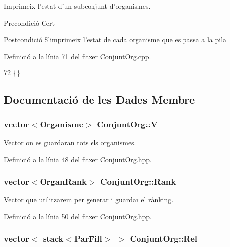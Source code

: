 Imprimeix l'estat d'un subconjunt d'organismes. 

\begin{DoxyPrecond}{Precondició}
Cert 
\end{DoxyPrecond}
\begin{DoxyPostcond}{Postcondició}
S'imprimeix l'estat de cada organisme que es passa a la pila 
\end{DoxyPostcond}


Definició a la línia 71 del fitxer Conjunt\-Org.\-cpp.


\begin{DoxyCode}
72 \{\}
\end{DoxyCode}


\subsection{Documentació de les Dades Membre}
\hypertarget{class_conjunt_org_adab11e0ac8295072ec682716478a535a}{
\subsubsection[{V}]{\setlength{\rightskip}{0pt plus 5cm}vector$<${\bf Organisme}$>$ Conjunt\-Org\-::\-V\hspace{0.3cm}{\ttfamily [private]}}}\label{class_conjunt_org_adab11e0ac8295072ec682716478a535a}


Vector on es guardaran tots els organismes. 



Definició a la línia 48 del fitxer Conjunt\-Org.\-hpp.

\hypertarget{class_conjunt_org_ae566806533e21f56caf27480d342c460}{
\subsubsection[{Rank}]{\setlength{\rightskip}{0pt plus 5cm}vector$<${\bf Organ\-Rank}$>$ Conjunt\-Org\-::\-Rank\hspace{0.3cm}{\ttfamily [private]}}}\label{class_conjunt_org_ae566806533e21f56caf27480d342c460}


Vector que utilitzarem per generar i guardar el rànking. 



Definició a la línia 50 del fitxer Conjunt\-Org.\-hpp.

\hypertarget{class_conjunt_org_a254051054023bf3ecbbe96c82cfe46a2}{
\subsubsection[{Rel}]{\setlength{\rightskip}{0pt plus 5cm}vector$<$ stack$<${\bf Par\-Fill}$>$ $>$ Conjunt\-Org\-::\-Rel\hspace{0.3cm}{\ttfamily [private]}}}\label{class_conjunt_org_a254051054023bf3ecbbe96c82cfe46a2}


